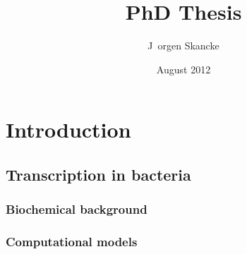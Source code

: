 \documentclass[b5paper]{report}
\title{PhD Thesis}
\author{J\ orgen Skancke}
\date{August 2012}
\begin{document}
 


\maketitle


\chapter{Introduction}



\section{Transcription in bacteria}
\subsection{Biochemical background}

\subsection{Computational models}





%
\end{document}
